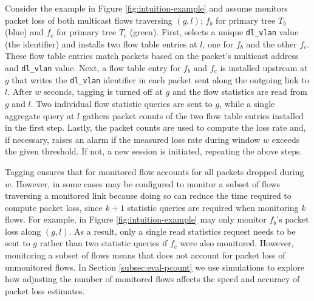 Consider the example in Figure \ref{fig:intuition-example} and assume \pcnt monitors packet loss of both multicast flows traversing $(g,l)$; $f_b$ for primary tree $T_b$ (blue) 
and $f_c$ for primary tree $T_c$ (green). %
First, \pcnt selects a unique {\tt dl\_vlan} value (the identifier) and installs two flow table entries at $l$, one for $f_b$ and the other $f_c$. 
These flow table entries match packets based on the packet's multicast address and {\tt dl\_vlan} value.
Next, a flow table entry for $f_b$ and $f_c$ is installed upstream at $g$ that writes the {\tt dl\_vlan} identifier in each packet sent along the outgoing link to $l$.  After
$w$ seconds, tagging is turned off at $g$ and the flow statistics are read from $g$ and $l$.  Two individual flow statistic queries are sent to $g$, while a single aggregate query at $l$
gathers packet counts of the two flow table entries installed in the first step. %
Lastly, the packet counts are used to compute the loss rate and, if necessary, \pcnt raises an alarm if the measured loss rate during window $w$ exceeds the given threshold.  If not, a 
new \pcnt session is initiated, repeating the above steps.


Tagging ensures that for monitored flow \pcnt accounts for all packets dropped during $w$. %
However, in some cases \pcnt may be configured to monitor a subset of flows traversing a monitored link because doing so can reduce the time required to compute packet loss, since 
$k+1$ statistic queries are required when monitoring $k$ flows.  For example, in Figure \ref{fig:intuition-example} \pcnt may only monitor $f_b$'s packet loss along $(g,l)$.  As a result,
only a single read statistics request needs to be sent to $g$ rather than two statistic queries if $f_c$ were also monitored.  However, monitoring a subset of flows means that
\pcnt does not account for packet loss of unmonitored flows.  In Section \ref{subsec:eval-pcount} we use simulations to explore how adjusting the number of monitored flows 
affects the  speed and accuracy of packet loss estimates.


